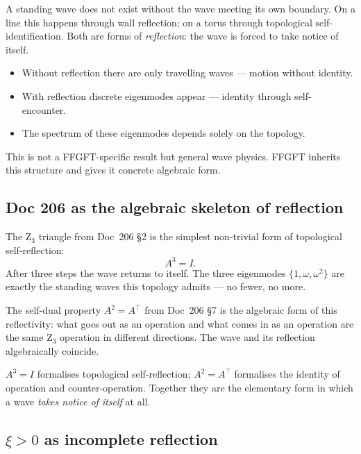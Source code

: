 A standing wave does not exist without the wave meeting its own boundary. On a line this happens through wall reflection; on a torus through topological self-identification. Both are forms of \emph{reflection}: the wave is forced to take notice of itself.

\begin{itemize}
\item Without reflection there are only travelling waves --- motion without identity.
\item With reflection discrete eigenmodes appear --- identity through self-encounter.
\item The spectrum of these eigenmodes depends solely on the topology.
\end{itemize}

This is not a FFGFT-specific result but general wave physics. FFGFT inherits this structure and gives it concrete algebraic form.

\subsection{Doc 206 as the algebraic skeleton of reflection}\label{sec:reflection_doc206}

The Z$_3$ triangle from Doc~206 \S2 is the simplest non-trivial form of topological self-reflection:
\begin{equation}
A^3 = I.
\end{equation}
After three steps the wave returns to itself. The three eigenmodes $\{1, \omega, \omega^2\}$ are exactly the standing waves this topology admits --- no fewer, no more.

The self-dual property $A^2 = A^\top$ from Doc~206 \S7 is the algebraic form of this reflectivity: what goes out as an operation and what comes in as an operation are the same Z$_3$ operation in different directions. The wave and its reflection algebraically coincide.

\begin{insightBox}
$A^3 = I$ formalises topological self-reflection; $A^2 = A^\top$ formalises the identity of operation and counter-operation. Together they are the elementary form in which a wave \emph{takes notice of itself} at all.
\end{insightBox}

\subsection{\texorpdfstring{$\xi > 0$ as incomplete reflection}{xi > 0 as incomplete reflection}}\label{sec:reflection_xi}

